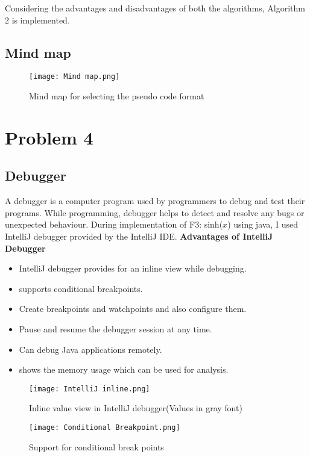 \documentclass{article}
\begin{document}
Considering the advantages and disadvantages of both the algorithms, Algorithm 2 is implemented.\newpage
\subsection{Mind map}
\begin{figure}[htp]
    \centering
    \texttt{[image: Mind map.png]}
    \caption{Mind map for selecting the pseudo code format}
    \label{Mind map for selecting the pseudo code format}
\end{figure}
\section{Problem 4}
\subsection{Debugger}
A debugger is a computer program used by programmers to debug and test their programs. While programming, debugger helps to detect and resolve any bugs or unexpected behaviour.\cite{6}
During implementation of F3: sinh($x$) using java, I used IntelliJ debugger provided by the IntelliJ IDE.
\newline
\newline
\textbf{Advantages of IntelliJ Debugger}
\begin{itemize}
    \item IntelliJ debugger provides for an inline view while debugging.
    \item supports conditional breakpoints.
    \item Create breakpoints and watchpoints and also configure them.
    \item Pause and resume the debugger session at any time.
    \item Can debug Java applications remotely.
    \item shows the memory usage which can be used for analysis.
\end{itemize}
\begin{figure}[htp]
    \centering
    \texttt{[image: IntelliJ inline.png]}
    \caption{Inline value view in IntelliJ debugger(Values in gray font)}
    \label{Inline value view in IntelliJ debugger(Values in gray font)}
\end{figure}\newline
\begin{figure}[htp]
    \centering
    \texttt{[image: Conditional Breakpoint.png]}
    \caption{Support for conditional break points}
    \label{Support for conditional break points}
\end{figure}
\end{document}

